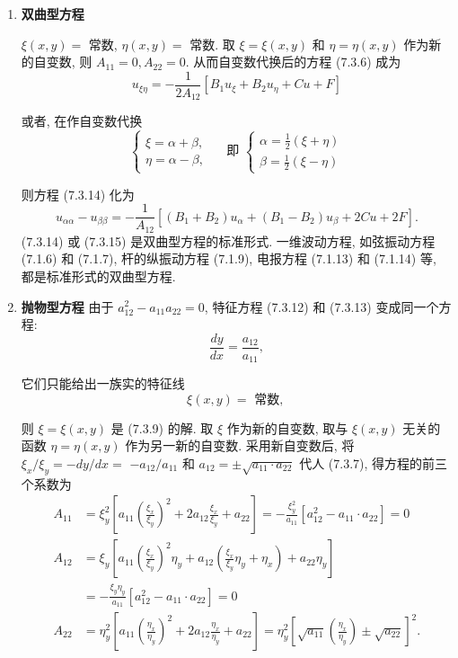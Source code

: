 \begin{enumerate}
    \item \textbf{双曲型方程}

$\xi(x, y)=$ 常数, $\eta(x, y)=$ 常数.
取 $\xi=\xi(x, y)$ 和 $\eta=\eta(x, y)$ 作为新的自变数, 则 $A_{11}=0, A_{22}=0$. 从而自变数代换后的方程 (7.3.6) 成为
$$
u_{\xi \eta}=-\frac{1}{2 A_{12}}\left[B_1 u_{\xi}+B_2 u_\eta+C u+F\right]
$$

或者, 在作自变数代换
$$
\left\{\begin{array} { l } 
{ \xi = \alpha + \beta , } \\
{ \eta = \alpha - \beta , }
\end{array} \quad \text { 即 } \left\{\begin{array}{l}
\alpha=\frac{1}{2}(\xi+\eta) \\
\beta=\frac{1}{2}(\xi-\eta)
\end{array}\right.\right.
$$

则方程 (7.3.14) 化为
$$
u_{\alpha \alpha}-u_{\beta \beta}=-\frac{1}{A_{12}}\left[\left(B_1+B_2\right) u_\alpha+\left(B_1-B_2\right) u_\beta+2 C u+2 F\right] .
$$
(7.3.14) 或 (7.3.15) 是双曲型方程的标准形式. 一维波动方程, 如弦振动方程 (7.1.6) 和 (7.1.7), 杆的纵振动方程 (7.1.9), 电报方程 (7.1.13) 和 (7.1.14) 等, 都是标准形式的双曲型方程.


\item \textbf{抛物型方程}
由于 $a_{12}^2-a_{11} a_{22}=0$, 特征方程 (7.3.12) 和 (7.3.13) 变成同一个方程:
$$
\frac{d y}{d x}=\frac{a_{12}}{a_{11}},
$$

它们只能给出一族实的特征线
$$
\xi(x, y)=\text { 常数, }
$$

则 $\xi=\xi(x, y)$ 是 (7.3.9) 的解. 取 $\xi$ 作为新的自变数, 取与 $\xi(x, y)$ 无关的函数 $\eta=\eta(x, y)$ 作为另一新的自变数. 采用新自变数后, 将 $\xi_x / \xi_y=-d y / d x=$ $-a_{12} / a_{11}$ 和 $a_{12}= \pm \sqrt{a_{11} \cdot a_{22}}$ 代人 (7.3.7), 得方程的前三个系数为
$$
\begin{aligned}
A_{11} & =\xi_y^2\left[a_{11}\left(\frac{\xi_x}{\xi_y}\right)^2+2 a_{12} \frac{\xi_x}{\xi_y}+a_{22}\right]=-\frac{\xi_y^2}{a_{11}}\left[a_{12}^2-a_{11} \cdot a_{22}\right]=0 \\
A_{12} & =\xi_y\left[a_{11}\left(\frac{\xi_x}{\xi_y}\right)^2 \eta_y+a_{12}\left(\frac{\xi_x}{\xi_y} \eta_y+\eta_x\right)+a_{22} \eta_y\right] \\
& =-\frac{\xi_y \eta_y}{a_{11}}\left[a_{12}^2-a_{11} \cdot a_{22}\right]=0 \\
A_{22} & =\eta_y^2\left[a_{11}\left(\frac{\eta_x}{\eta_y}\right)^2+2 a_{12} \frac{\eta_x}{\eta_y}+a_{22}\right]=\eta_y^2\left[\sqrt{a_{11}}\left(\frac{\eta_x}{\eta_y}\right) \pm \sqrt{a_{22}}\right]^2 .
\end{aligned}
$$


\end{enumerate}
